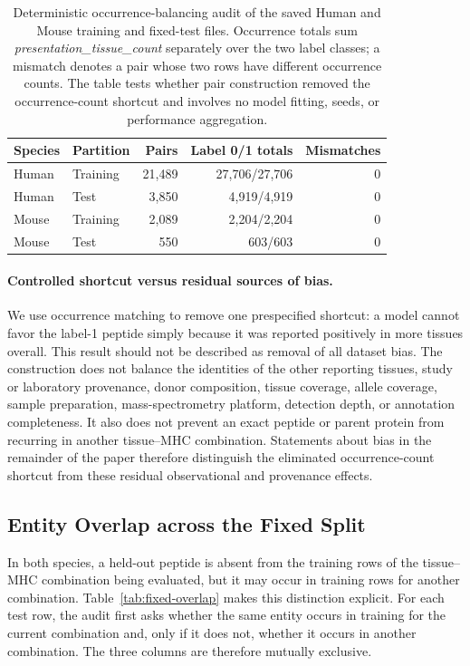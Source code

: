 \begin{table}[tbp]
\centering
\caption{Deterministic occurrence-balancing audit of the saved Human and Mouse training and fixed-test files. Occurrence totals sum \mbox{\textit{presentation\_tissue\_count}} separately over the two label classes; a mismatch denotes a pair whose two rows have different occurrence counts. The table tests whether pair construction removed the occurrence-count shortcut and involves no model fitting, seeds, or performance aggregation.}
\label{tab:occurrence-balance-audit}
\small
\begin{tabularx}{\columnwidth}{@{}llrrr@{}}
\toprule
Species & Partition & Pairs & Label 0/1 totals & Mismatches \\
\midrule
Human & Training & 21,489 & 27,706/27,706 & 0 \\
Human & Test & 3,850 & 4,919/4,919 & 0 \\
Mouse & Training & 2,089 & 2,204/2,204 & 0 \\
Mouse & Test & 550 & 603/603 & 0 \\
\bottomrule
\end{tabularx}
\end{table}

\paragraph{Controlled shortcut versus residual sources of bias.}
We use occurrence matching to remove one prespecified shortcut: a model cannot favor the label-1 peptide simply because it was reported positively in more tissues overall. This result should not be described as removal of all dataset bias. The construction does not balance the identities of the other reporting tissues, study or laboratory provenance, donor composition, tissue coverage, allele coverage, sample preparation, mass-spectrometry platform, detection depth, or annotation completeness. It also does not prevent an exact peptide or parent protein from recurring in another tissue--MHC combination. Statements about bias in the remainder of the paper therefore distinguish the eliminated occurrence-count shortcut from these residual observational and provenance effects.

\subsection{Entity Overlap across the Fixed Split}
\label{sec:entity-overlap}

In both species, a held-out peptide is absent from the training rows of the tissue--MHC combination being evaluated, but it may occur in training rows for another combination. Table~\ref{tab:fixed-overlap} makes this distinction explicit. For each test row, the audit first asks whether the same entity occurs in training for the current combination and, only if it does not, whether it occurs in another combination. The three columns are therefore mutually exclusive.

